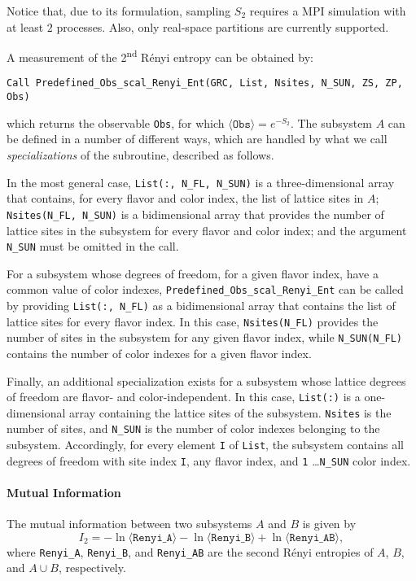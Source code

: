 Notice that, due to its formulation, sampling $S_2$ requires a MPI simulation with at least $2$ processes. Also, only real-space partitions are currently supported.

A measurement of the 2\textsuperscript{nd} R\'enyi entropy can be obtained by:
\begin{lstlisting}[style=fortran]
Call Predefined_Obs_scal_Renyi_Ent(GRC, List, Nsites, N_SUN, ZS, ZP, Obs)
\end{lstlisting}
which returns the observable \texttt{Obs}, for which $\langle\texttt{Obs}\rangle=e^{-S_2}$.
The subsystem $A$ can be defined in a number of different ways, which are handled by what we call \emph{specializations} of the subroutine, described as follows.

In the most general case, \texttt{List(:, N\_FL, N\_SUN)} is a three-dimensional array that contains, for every flavor and color index, the list of lattice sites in $A$; \texttt{Nsites(N\_FL, N\_SUN)} is a bidimensional array that provides the number of lattice sites in the subsystem for every flavor and color index; and the argument \texttt{N\_SUN} must be omitted in the call.

For a subsystem whose degrees of freedom, for a given flavor index, have a common value of color indexes, \texttt{Predefined\_Obs\_scal\_Renyi\_Ent} can be called by providing \texttt{List(:, N\_FL)} as a bidimensional array that contains the list of lattice sites for every flavor index. In this case, \texttt{Nsites(N\_FL)} provides the number of sites in the subsystem for any given flavor index, while \texttt{N\_SUN(N\_FL)} contains the number of color indexes for a given flavor index.

Finally, an additional specialization exists for a subsystem whose lattice degrees of freedom are flavor- and color-independent. In this case, \texttt{List(:)} is a one-dimensional array containing the lattice sites of the subsystem. \texttt{Nsites} is the number of sites, and \texttt{N\_SUN} is the number of color indexes belonging to the subsystem.
Accordingly, for every element \texttt{I} of \texttt{List}, the subsystem contains all degrees of freedom with site index \texttt{I}, any flavor index, and \texttt{1} \ldots \texttt{N\_SUN} color index.

\paragraph*{Mutual Information}
The mutual information between two subsystems $A$ and $B$ is given by
\begin{equation}
I_2=-\ln \langle \texttt{Renyi\_A}\rangle -\ln \langle \texttt{Renyi\_B}\rangle +\ln \langle \texttt{Renyi\_AB}\rangle,
\end{equation}
where \texttt{Renyi\_A}, \texttt{Renyi\_B}, and \texttt{Renyi\_AB} are the second R\'enyi entropies of $A$, $B$, and $A\cup B$, respectively.


